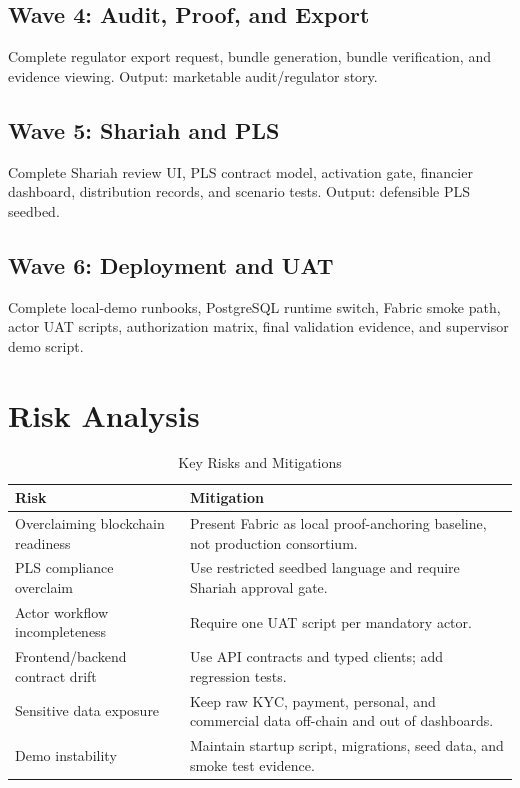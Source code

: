 \documentclass[conference]{IEEEtran}
\begin{document}
\subsection{Wave 4: Audit, Proof, and Export}
Complete regulator export request, bundle generation, bundle verification, and evidence viewing. Output: marketable audit/regulator story.

\subsection{Wave 5: Shariah and PLS}
Complete Shariah review UI, PLS contract model, activation gate, financier dashboard, distribution records, and scenario tests. Output: defensible PLS seedbed.

\subsection{Wave 6: Deployment and UAT}
Complete local-demo runbooks, PostgreSQL runtime switch, Fabric smoke path, actor UAT scripts, authorization matrix, final validation evidence, and supervisor demo script.

\section{Risk Analysis}

\begin{table}[htbp]
\caption{Key Risks and Mitigations}
\label{tab:risks}
\centering
\small
\begin{tabularx}{\columnwidth}{p{}X}
\toprule
Risk & Mitigation \\
\midrule
Overclaiming blockchain readiness & Present Fabric as local proof-anchoring baseline, not production consortium. \\
PLS compliance overclaim & Use restricted seedbed language and require Shariah approval gate. \\
Actor workflow incompleteness & Require one UAT script per mandatory actor. \\
Frontend/backend contract drift & Use API contracts and typed clients; add regression tests. \\
Sensitive data exposure & Keep raw KYC, payment, personal, and commercial data off-chain and out of dashboards. \\
Demo instability & Maintain startup script, migrations, seed data, and smoke test evidence. \\
\bottomrule
\end{tabularx}
\end{table}
\end{document}
